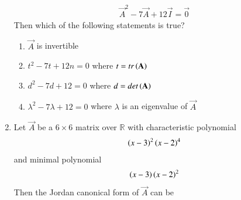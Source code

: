 \begin{enumerate}[label=\thesection.\arabic*.,ref=\thesection.\theenumi]
\begin{align}
\vec{A}^2 - 7\vec{A} + 12\vec{I} = \vec{0}
\end{align}
%
Then which of the following statements is true?
\begin{enumerate}
\item  $\vec{A}$ is invertible
\item $t^2-7t+12n = 0$ where $t = tr\left(\mathbf{A}\right)$
\item $d^2-7d+12 = 0$ where $d = det\left(\mathbf{A}\right)$
\item $\lambda^2-7\lambda+12 = 0$ where $\lambda$ is an eigenvalue of $\vec{A}$
\end{enumerate}
%
\solution

\item Let $\vec{A}$ be a $6 \times 6$ matrix over $\mathbb{R}$ with characteristic polynomial
%
\begin{align}
\left(x-3\right)^2
\left(x-2\right)^4
\end{align}
%
and minimal polynomial
%
\begin{align}
\left(x-3\right)
\left(x-2\right)^2
\end{align}
%
Then the Jordan canonical form of $\vec{A}$ can be
\end{enumerate}
